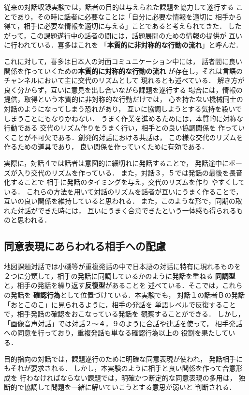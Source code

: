 従来の対話収録実験では，話者の目的は与えられた課題を協力して遂行する
ことであり，その時に話者に必要なことは「自分に必要な情報を適切に
相手から得て，相手に必要な情報を適切に与える」ことであると考えられてきた．
したがって，この課題遂行中の話者の間には，話題展開のための情報の提供が
互いに行われている．喜多はこれを
「{\bf 本質的に非対称的な行動の流れ}\cite{Kita1996}」と呼んだ．

これに対して，喜多は日本人の対面コミュニケーション中には，
話者間に良い関係を作っていくための{\bf 本質的に対称的な行動の流れ}
が存在し，それは言語のチャンネルにおいて主に交代のリズムとして
現れるとも述べている．
解き方が良く分からず，互いに意見を出し合いながら課題を遂行する
場合には，情報の提供，取得という本質的に非対称的な行動だけでは，
心を持たない機械同士の対話のようになってしまう恐れがあり，
互いに協調しようとする気持を殺いでしまうことにもなりかねない．
うまく作業を進めるためには，本質的に対称な行動である
交代のリズム作りをうまく行い，相手との良い協調関係を
作っていくことが不可欠である．創発的対話における共話は，
この様な交代のリズムを作るための道具であり，
良い関係を作っていくために有効である．

実際に，対話４では話者は意図的に細切れに発話することで，
発話途中にポーズが入り交代のリズムを作っている．
また，対話３，５では発話の最後を長音化することで
相手に発話のタイミングを与え，交代のリズムを作り
やすくしている．
これらの方法を用いて対話のリズムを話者が互いにうまく作ることで，
互いの良い関係を維持していると思われる．
また，このような形で，同期の取れた対話ができた時には，
互いにうまく合意できたという一体感も得られるものと思われる．

\subsection{同意表現にあらわれる相手への配慮}
地図課題対話では小磯等が重複発話の中で日本語の対話に特有に現れるものを
２つに分類して，相手の発話に同調しているかのように発話を重ねる
{\bf 同調型}と，相手の発話を繰り返す{\bf 反復型}があることを
述べている\cite{Koiso.etal.1996b}．そこでは，これらの発話を
{\bf 確認行為}として位置づけている．本実験でも，
対話１の話者Ｂの発話「おとこのこ」に見られるように，相手の発話を
単語レベルで反復することで，相手発話の確認をおこなっている発話を
観察することができる．
しかし，「画像音声対話」では対話２〜４，９のように合話や連話を使って，
相手発話への同意を行っており，重複発話も単なる確認行為以上の
役割を果たしている．

目的指向の対話では，課題遂行のために明確な同意表現が使われ，
発話相手にもそれが要求される．
しかし，本実験のように相手と良い関係を作って合意形成を
行わなければならない課題では，明確かつ断定的な同意表現の多用は，
独断的で協調して問題を一緒に解いていこうとする意思が弱いと
判断される．

